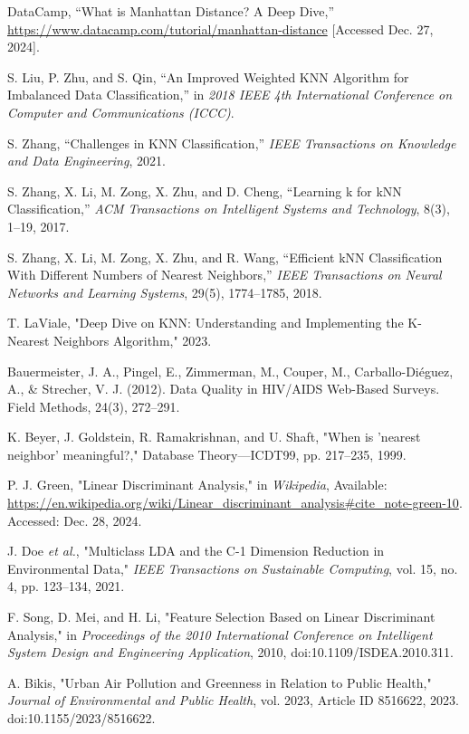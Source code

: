 \documentclass[10pt,twocolumn]{article}
\begin{document}
\begin{thebibliography}{99}
DataCamp, ``What is Manhattan Distance? A Deep Dive,'' \url{https://www.datacamp.com/tutorial/manhattan-distance} [Accessed Dec. 27, 2024].

S. Liu, P. Zhu, and S. Qin, ``An Improved Weighted KNN Algorithm for Imbalanced Data Classification,'' 
in \emph{2018 IEEE 4th International Conference on Computer and Communications (ICCC)}.

S. Zhang, ``Challenges in KNN Classification,'' \emph{IEEE Transactions on Knowledge and Data Engineering}, 2021.

S. Zhang, X. Li, M. Zong, X. Zhu, and D. Cheng, ``Learning k for kNN Classification,'' 
\emph{ACM Transactions on Intelligent Systems and Technology}, 8(3), 1–19, 2017.

S. Zhang, X. Li, M. Zong, X. Zhu, and R. Wang, ``Efficient kNN Classification With Different Numbers of Nearest Neighbors,'' 
\emph{IEEE Transactions on Neural Networks and Learning Systems}, 29(5), 1774–1785, 2018.

 T. LaViale, "Deep Dive on KNN: Understanding and Implementing the K-Nearest Neighbors Algorithm," 2023.

 Bauermeister, J. A., Pingel, E., Zimmerman, M., Couper, M., Carballo-Diéguez, A., & Strecher, V. J. (2012). Data Quality in HIV/AIDS Web-Based Surveys. Field Methods, 24(3), 272–291.

 K. Beyer, J. Goldstein, R. Ramakrishnan, and U. Shaft, "When is 'nearest neighbor' meaningful?," Database Theory—ICDT99, pp. 217–235, 1999.

P. J. Green, "Linear Discriminant Analysis," in \emph{Wikipedia}, Available: \url{https://en.wikipedia.org/wiki/Linear_discriminant_analysis#cite_note-green-10}. Accessed: Dec. 28, 2024.

J. Doe \textit{et al.}, "Multiclass LDA and the C-1 Dimension Reduction in Environmental Data," \textit{IEEE Transactions on Sustainable Computing}, vol. 15, no. 4, pp. 123--134, 2021.

 F. Song, D. Mei, and H. Li, "Feature Selection Based on Linear Discriminant Analysis," in \textit{Proceedings of the 2010 International Conference on Intelligent System Design and Engineering Application}, 2010, doi:10.1109/ISDEA.2010.311.

 A. Bikis, "Urban Air Pollution and Greenness in Relation to Public Health," \textit{Journal of Environmental and Public Health}, vol. 2023, Article ID 8516622, 2023. doi:10.1155/2023/8516622.


\end{thebibliography}
\end{document}
